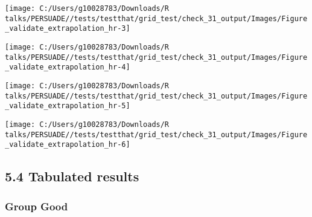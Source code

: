\documentclass[
]{article}
\begin{document}
\begin{flushleft}\texttt{[image: C:/Users/g10028783/Downloads/R talks/PERSUADE//tests/testthat/grid\_test/check\_31\_output/Images/Figure\_validate\_extrapolation\_hr-3]} \end{flushleft}

\begin{flushleft}\texttt{[image: C:/Users/g10028783/Downloads/R talks/PERSUADE//tests/testthat/grid\_test/check\_31\_output/Images/Figure\_validate\_extrapolation\_hr-4]} \end{flushleft}

\begin{flushleft}\texttt{[image: C:/Users/g10028783/Downloads/R talks/PERSUADE//tests/testthat/grid\_test/check\_31\_output/Images/Figure\_validate\_extrapolation\_hr-5]} \end{flushleft}

\begin{flushleft}\texttt{[image: C:/Users/g10028783/Downloads/R talks/PERSUADE//tests/testthat/grid\_test/check\_31\_output/Images/Figure\_validate\_extrapolation\_hr-6]} \end{flushleft}

\clearpage

\subsection{5.4 Tabulated results}\label{tabulated-results}

\subsubsection{Group Good}\label{group-good}
\end{document}
